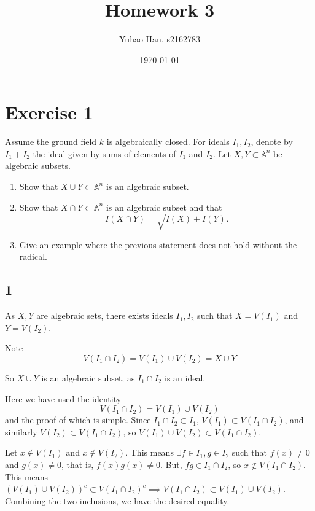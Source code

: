 \documentclass{article}
\title{Homework 3}
\author{Yuhao Han, s2162783}
\date{\today}
\theoremstyle{definition}
\theoremstyle{definition}
\theoremstyle{remark}
\begin{document}
\maketitle
\section*{Exercise 1}
Assume the ground field $k$ is algebraically closed. For ideals $I_1, I_2$, denote by $I_1 + I_2$ the ideal given by sums of elements of $I_1$ and $I_2$. Let $X, Y \subset \mathbb{A}^n$ be algebraic subsets.

\begin{enumerate}
    \item Show that $X \cup Y \subset \mathbb{A}^n$ is an algebraic subset.
    \item Show that $X \cap Y \subset \mathbb{A}^n$ is an algebraic subset and that
    \[
        I(X \cap Y) = \sqrt{I(X) + I(Y)}.
    \]
    \item Give an example where the previous statement does not hold without the radical.
\end{enumerate}

\subsection*{1}

As $X, Y$ are algebraic sets, there exists ideals $I_1, I_2$ such that $X = V(I_1)$ and $Y = V(I_2)$. 

Note 
\begin{equation}
	V(I_1 \cap I_2) = V(I_1) \cup V(I_2) = X \cup Y
\end{equation}

So $X \cup Y$ is an algebraic subset, as $I_1 \cap I_2$ is an ideal.

Here we have used the identity
\begin{equation}
	V(I_1 \cap I_2) = V(I_1) \cup V(I_2) 
\end{equation}
and the proof of which is simple.
Since $I_1 \cap I_2 \subset I_1$, $V(I_1) \subset V(I_1 \cap I_2)$, and similarly $V(I_2) \subset V(I_1 \cap I_2)$, so $V(I_1) \cup V(I_2) \subset V(I_1 \cap I_2)$.

Let $x \notin V(I_1)$ and $x \notin V(I_2)$. 
This means $\exists f \in I_1, g \in I_2$ such that $f(x) \neq 0$ and $g(x)\neq 0$, that is, $f(x)g(x) \neq 0$. 
But, $fg \in I_1 \cap I_2$, so $x \notin V(I_1 \cap I_2)$.
This means $(V(I_1) \cup V(I_2))^c \subset V(I_1 \cap I_2)^c \implies V(I_1 \cap I_2) \subset V(I_1) \cup V(I_2)$.
Combining the two inclusions, we have the desired equality.
\end{document}
